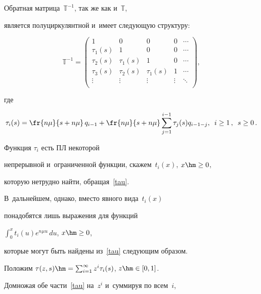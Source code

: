 Обратная мат\-ри\-ца~$\mathbb{T}^{-1}$, так же как и~$\mathbb{T}$,

является полуциркулянтной и~имеет сле\-ду\-ющую структуру:

$$

\mathbb{T}^{-1}

= \begin{pmatrix}

1 & 0 & 0 & 0 & \cdots \\

\tau_1(s) & 1 & 0 & 0 & \cdots \\

\tau_2(s) & \tau_1(s) & 1 & 0 & \cdots\\

\tau_3(s) & \tau_2(s) & \tau_1(s) & 1 & \cdots \\

\vdots & \vdots & \vdots

 & \vdots & \ddots \\

\end{pmatrix},

$$

где

\begin{equation}

\label{tau}

\tau_i(s)

= \fr{n\mu}{{s+n\mu}}\, q_{i-1} +\fr{n\mu}{{s+n\mu}}

\sum\limits_{j=1}^{i-1} \tau_j(s) q_{i-1-j} , \enskip i \ge 1\,, \enskip s \ge 0\,.

\end{equation}

Функция $\tau_i$ есть ПЛ некоторой

непрерывной и~ограниченной функции, скажем~$t_i(x)$, $x \hm\ge 0$,

которую нетрудно найти, обращая~\eqref{tau}.

В~дальнейшем, однако, вместо явного вида~$t_i(x)$

понадобятся лишь выражения для функций

${\int\nolimits_0^x t_i(u) e^{ n\mu u}\, du}$, $x \hm\ge 0$,

которые могут быть найдены из~\eqref{tau} сле\-ду\-ющим образом.

Положим ${\tau(z,s)\hm=\sum\nolimits_{i=1}^\infty z^i \tau_i(s)}$, $z\hm\in [0,1]$.

Домножая обе части~\eqref{tau} на~$z^i$ и~суммируя по всем~$i$,

